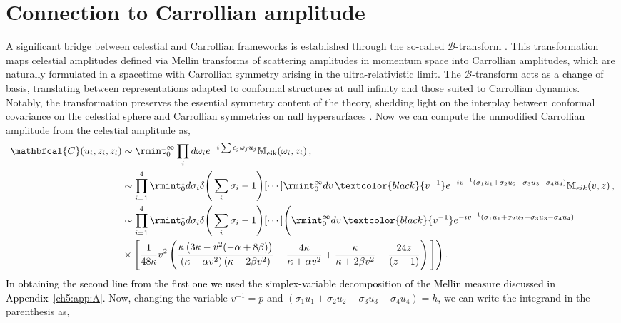 \section{Connection to Carrollian amplitude}
\label{ch5:sec5}
A significant bridge between celestial and Carrollian frameworks is established through the so-called $\mathcal{B}$-transform \cite{Donnay:2022aba,Donnay:2022wvx}. This transformation maps celestial amplitudes defined via Mellin transforms of scattering amplitudes in momentum space into Carrollian amplitudes, which are naturally formulated in a spacetime with Carrollian symmetry arising in the ultra-relativistic limit. The $\mathcal{B}$-transform acts as a change of basis, translating between representations adapted to conformal structures at null infinity and those suited to Carrollian dynamics. Notably, the transformation preserves the essential symmetry content of the theory, shedding light on the interplay between conformal covariance on the celestial sphere and Carrollian symmetries on null hypersurfaces \cite{Donnay:2022aba,Bagchi:2022emh,Donnay:2022wvx}. Now we can compute the unmodified Carrollian amplitude from the celestial amplitude as,
\begin{align}
\begin{split}
   \mathbfcal{C}(u_i,z_i,\bar z_i)&\sim\rmint_0^\infty \prod_id\omega_i e^{-i\sum\epsilon_j\omega_j u_j}\mathbb{M}_{\textrm{eik}}(\omega_i,z_i)\,,\\&
    \sim\prod_{i=1}^4 \rmint_0^1 d\sigma_i \delta{\Bigg(\sum_i\sigma_i-1\Bigg)}[\cdots]\rmint_0^\infty dv \,\textcolor{black}{v^{-1}}e^{-iv^{-1}(\sigma_1u_1+\sigma_2u_2-\sigma_3u_3-\sigma_4u_4)}\mathbb{M}_{eik}(v,z)\,,\\&
    \sim \prod_{i=1}^4 \rmint_0^1 d\sigma_i \delta{\Bigg(\sum_i\sigma_i-1\Bigg)}[\cdots]\Bigg(\rmint_0^\infty dv \,\textcolor{black}{v^{-1}}e^{-iv^{-1}(\sigma_1u_1+\sigma_2u_2-\sigma_3u_3-\sigma_4u_4)}\\&\times\Bigg[ \frac{1}{48\kappa} v^2 \left(\frac{\kappa \left(3 \kappa-v^2 (-\alpha +8 \beta )\right)}{\left(\kappa-\alpha  v^2\right) \left(\kappa-2 \beta  v^2\right)}-\frac{4 \kappa}{\kappa+\alpha  v^2}+\frac{\kappa}{\kappa+2 \beta  v^2}-\frac{24 z}{(z-1)}\right)\Bigg]\Bigg)\,.
       \end{split}
\end{align}
\textcolor{black}{In obtaining the second line from the first one we used the simplex-variable decomposition of the Mellin measure discussed in Appendix~\ref{ch5:app:A}.} Now, changing the variable $v^{-1}=p$ and $(\sigma_1u_1+\sigma_2u_2-\sigma_3u_3-\sigma_4u_4)=h$, we can write the integrand in the parenthesis as,
